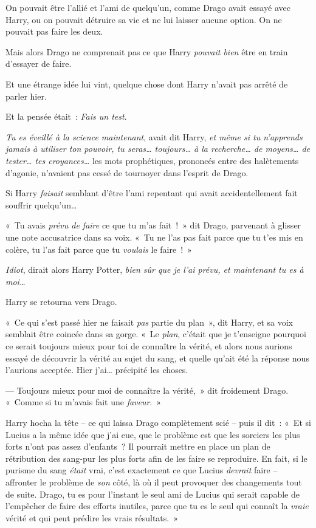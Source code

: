 On pouvait être l'allié et l'ami de quelqu'un, comme Drago avait essayé avec Harry, ou on pouvait détruire sa vie et ne lui laisser aucune option.
On ne pouvait pas faire les deux.

Mais alors Drago ne comprenait pas ce que Harry \emph{pouvait bien} être en train d'essayer de faire.

Et une étrange idée lui vint, quelque chose dont Harry n'avait pas arrêté de parler hier.

Et la pensée était~: \emph{Fais un test}.

\emph{Tu es éveillé à la science maintenant}, avait dit Harry, \emph{et même si tu n'apprends jamais à utiliser ton pouvoir, tu seras… toujours… à la recherche… de moyens… de tester… tes croyances…} les mots prophétiques, prononcés entre des halètements d'agonie, n'avaient pas cessé de tournoyer dans l'esprit de Drago.

Si Harry \emph{faisait} semblant d'être l'ami repentant qui avait accidentellement fait souffrir quelqu'un…

«~Tu avais \emph{prévu de faire} ce que tu m'as fait~!~»
dit Drago, parvenant à glisser une note accusatrice dans sa voix.
«~Tu ne l'as pas fait parce que tu t'es mis en colère, tu l'as fait parce que tu \emph{voulais} le faire~!~»

\emph{Idiot}, dirait alors Harry Potter, \emph{bien sûr que je l'ai prévu, et maintenant tu es à moi…}

Harry se retourna vers Drago.

«~Ce qui s'est passé hier ne faisait \emph{pas} partie du plan~», dit Harry, et sa voix semblait être coincée dans sa gorge.
«~Le \emph{plan}, c'était que je t'enseigne pourquoi ce serait toujours mieux pour toi de connaître la vérité, et alors nous aurions essayé de découvrir la vérité au sujet du sang, et quelle qu'ait été la réponse nous l'aurions acceptée.
Hier j'ai… précipité les choses.

--- Toujours mieux pour moi de connaître la vérité,~» dit froidement Drago.
«~Comme si tu m'avais fait une \emph{faveur}.~»

Harry hocha la tête -- ce qui laissa Drago complètement scié -- puis il dit~: «~Et si Lucius a la même idée que j'ai eue, que le problème est que les sorciers les plus forts n'ont pas assez d'enfants~?
Il pourrait mettre en place un plan de rétribution des sang-pur les plus forts afin de les faire se reproduire.
En fait, si le purisme du sang \emph{était} vrai, c'est exactement ce que Lucius \emph{devrait} faire -- affronter le problème de \emph{son} côté, là où il peut provoquer des changements tout de suite.
Drago, tu es pour l'instant le seul ami de Lucius qui serait capable de l'empêcher de faire des efforts inutiles, parce que tu es le seul qui connaît la \emph{vraie} vérité et qui peut prédire les vrais résultats.~»

